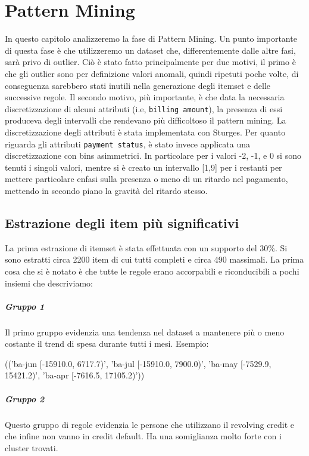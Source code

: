 \chapter{Pattern Mining}
In questo capitolo analizzeremo la fase di Pattern Mining.
Un punto importante di questa fase \`e che utilizzeremo un dataset che,
differentemente dalle altre fasi, sar\`a privo di outlier. Ci\`o \`e
stato fatto principalmente per due motivi, il primo \`e che gli outlier
sono per definizione valori anomali, quindi ripetuti poche volte, di
conseguenza sarebbero stati inutili nella generazione degli itemset e delle
successive regole. Il secondo motivo, pi\`u importante, \`e che data la necessaria
discretizzazione di alcuni attributi (i.e, \texttt{billing amount}), la presenza
di essi produceva degli intervalli che rendevano pi\`u difficoltoso il pattern
mining.
La discretizzazione degli attributi \`e stata implementata con Sturges.
Per quanto riguarda gli attributi \texttt{payment status}, \`e stato
invece applicata una discretizzazione con bins asimmetrici.
In particolare per i valori -2, -1, e 0 si sono tenuti i singoli valori, mentre
si \`e creato un intervallo [1,9] per i restanti per mettere particolare enfasi
sulla presenza o meno di un ritardo nel pagamento, mettendo in secondo piano la
gravit\`a del ritardo stesso.

\section{Estrazione degli item pi\`u significativi}
La prima estrazione di itemset \`e stata effettuata con un supporto del 30\%.
Si sono estratti circa 2200 item di cui tutti completi e circa 490 massimali.
La prima cosa che si \`e notato \`e che tutte le regole erano accorpabili e
riconducibili a pochi insiemi che descriviamo:

\paragraph{Gruppo 1}
Il primo gruppo evidenzia una tendenza nel dataset a mantenere pi\`u o meno
costante il trend di spesa durante tutti i mesi.
Esempio:
\begin{center}
	(('ba-jun [-15910.0, 6717.7)', 'ba-jul [-15910.0, 7900.0)', 'ba-may [-7529.9, 15421.2)', 'ba-apr [-7616.5, 17105.2)'))
\end{center}

\paragraph{Gruppo 2}
Questo gruppo di regole evidenzia le persone che utilizzano il revolving credit e
che infine non vanno in credit default. Ha una somiglianza molto forte con
i cluster trovati.

